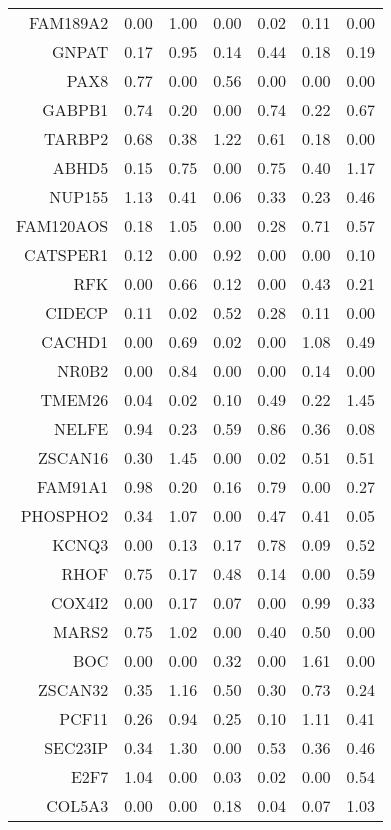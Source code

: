\begin{longtable}{rrrrrrr}
  FAM189A2 & 0.00 & 1.00 & 0.00 & 0.02 & 0.11 & 0.00 \\ 
  GNPAT & 0.17 & 0.95 & 0.14 & 0.44 & 0.18 & 0.19 \\ 
  PAX8 & 0.77 & 0.00 & 0.56 & 0.00 & 0.00 & 0.00 \\ 
  GABPB1 & 0.74 & 0.20 & 0.00 & 0.74 & 0.22 & 0.67 \\ 
  TARBP2 & 0.68 & 0.38 & 1.22 & 0.61 & 0.18 & 0.00 \\ 
  ABHD5 & 0.15 & 0.75 & 0.00 & 0.75 & 0.40 & 1.17 \\ 
  NUP155 & 1.13 & 0.41 & 0.06 & 0.33 & 0.23 & 0.46 \\ 
  FAM120AOS & 0.18 & 1.05 & 0.00 & 0.28 & 0.71 & 0.57 \\ 
  CATSPER1 & 0.12 & 0.00 & 0.92 & 0.00 & 0.00 & 0.10 \\ 
  RFK & 0.00 & 0.66 & 0.12 & 0.00 & 0.43 & 0.21 \\ 
  CIDECP & 0.11 & 0.02 & 0.52 & 0.28 & 0.11 & 0.00 \\ 
  CACHD1 & 0.00 & 0.69 & 0.02 & 0.00 & 1.08 & 0.49 \\ 
  NR0B2 & 0.00 & 0.84 & 0.00 & 0.00 & 0.14 & 0.00 \\ 
  TMEM26 & 0.04 & 0.02 & 0.10 & 0.49 & 0.22 & 1.45 \\ 
  NELFE & 0.94 & 0.23 & 0.59 & 0.86 & 0.36 & 0.08 \\ 
  ZSCAN16 & 0.30 & 1.45 & 0.00 & 0.02 & 0.51 & 0.51 \\ 
  FAM91A1 & 0.98 & 0.20 & 0.16 & 0.79 & 0.00 & 0.27 \\ 
  PHOSPHO2 & 0.34 & 1.07 & 0.00 & 0.47 & 0.41 & 0.05 \\ 
  KCNQ3 & 0.00 & 0.13 & 0.17 & 0.78 & 0.09 & 0.52 \\ 
  RHOF & 0.75 & 0.17 & 0.48 & 0.14 & 0.00 & 0.59 \\ 
  COX4I2 & 0.00 & 0.17 & 0.07 & 0.00 & 0.99 & 0.33 \\ 
  MARS2 & 0.75 & 1.02 & 0.00 & 0.40 & 0.50 & 0.00 \\ 
  BOC & 0.00 & 0.00 & 0.32 & 0.00 & 1.61 & 0.00 \\ 
  ZSCAN32 & 0.35 & 1.16 & 0.50 & 0.30 & 0.73 & 0.24 \\ 
  PCF11 & 0.26 & 0.94 & 0.25 & 0.10 & 1.11 & 0.41 \\ 
  SEC23IP & 0.34 & 1.30 & 0.00 & 0.53 & 0.36 & 0.46 \\ 
  E2F7 & 1.04 & 0.00 & 0.03 & 0.02 & 0.00 & 0.54 \\ 
  COL5A3 & 0.00 & 0.00 & 0.18 & 0.04 & 0.07 & 1.03 \\ 

\end{longtable}
